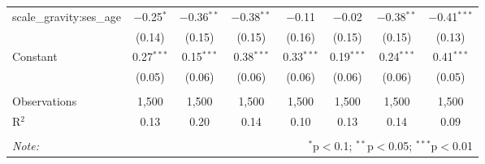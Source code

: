 \documentclass[
]{article}
\begin{document}
\begin{sidewaystable}[!htbp]
\begin{tabular}{@{\extracolsep{1pt}}lccccccc}
  scale\_gravity:ses\_age & $-$0.25$^{*}$ & $-$0.36$^{**}$ & $-$0.38$^{**}$ & $-$0.11 & $-$0.02 & $-$0.38$^{**}$ & $-$0.41$^{***}$ \\ 
  & (0.14) & (0.15) & (0.15) & (0.16) & (0.15) & (0.15) & (0.13) \\ 
  Constant & 0.27$^{***}$ & 0.15$^{***}$ & 0.38$^{***}$ & 0.33$^{***}$ & 0.19$^{***}$ & 0.24$^{***}$ & 0.41$^{***}$ \\ 
  & (0.05) & (0.06) & (0.06) & (0.06) & (0.06) & (0.06) & (0.05) \\ 
 \hline \\[-1.8ex] 
Observations & 1,500 & 1,500 & 1,500 & 1,500 & 1,500 & 1,500 & 1,500 \\ 
R$^{2}$ & 0.13 & 0.20 & 0.14 & 0.10 & 0.13 & 0.14 & 0.09 \\ 
\hline 
\hline \\[-1.8ex] 
\textit{Note:}  & \multicolumn{7}{r}{$^{*}$p$<$0.1; $^{**}$p$<$0.05; $^{***}$p$<$0.01} \\ 
\end{tabular} 
\end{sidewaystable}
\end{document}
